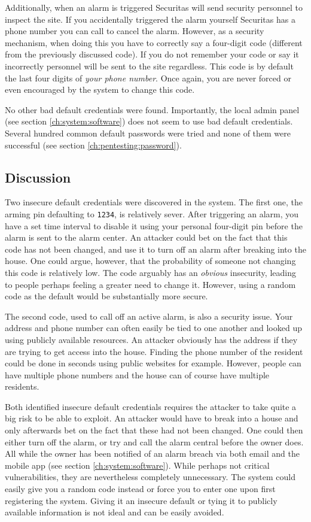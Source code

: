 Additionally, when an alarm is triggered Securitas will send security personnel to inspect the site. If you accidentally triggered the alarm yourself Securitas has a phone number you can call to cancel the alarm. However, as a security mechanism, when doing this you have to correctly say a four-digit code (different from the previously discussed code). If you do not remember your code or say it incorrectly personnel will be sent to the site regardless. This code is by default the last four digits of \textit{your phone number}. Once again, you are never forced or even encouraged by the system to change this code.

No other bad default credentials were found. Importantly, the local admin panel (see section \ref{ch:system:software}) does not seem to use bad default credentials. Several hundred common default passwords were tried and none of them were successful (see section \ref{ch:pentesting:password}).

\subsection{Discussion}
Two insecure default credentials were discovered in the system. The first one, the arming pin defaulting to \texttt{1234}, is relatively sever. After triggering an alarm, you have a set time interval to disable it using your personal four-digit pin before the alarm is sent to the alarm center. An attacker could bet on the fact that this code has not been changed, and use it to turn off an alarm after breaking into the house. One could argue, however, that the probability of someone not changing this code is relatively low. The code arguably has an \textit{obvious} insecurity, leading to people perhaps feeling a greater need to change it. However, using a random code as the default would be substantially more secure.

The second code, used to call off an active alarm, is also a security issue. Your address and phone number can often easily be tied to one another and looked up using publicly available resources. An attacker obviously has the address if they are trying to get access into the house. Finding the phone number of the resident could be done in seconds using public websites for example. However, people can have multiple phone numbers and the house can of course have multiple residents.

Both identified insecure default credentials requires the attacker to take quite a big risk to be able to exploit. An attacker would have to break into a house and only afterwards bet on the fact that these had not been changed. One could then either turn off the alarm, or try and call the alarm central before the owner does. All while the owner has been notified of an alarm breach via both email and the mobile app (see section \ref{ch:system:software}). While perhaps not critical vulnerabilities, they are nevertheless completely unnecessary. The system could easily give you a random code instead or force you to enter one upon first registering the system. Giving it an insecure default or tying it to publicly available information is not ideal and can be easily avoided.
